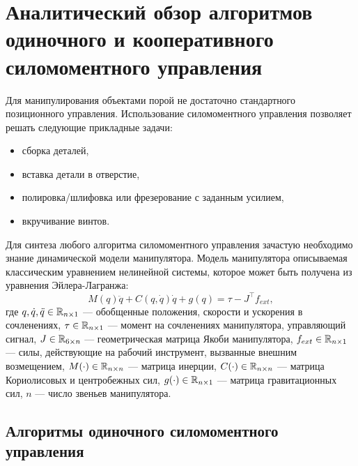\chapter{Аналитический обзор алгоритмов одиночного и кооперативного силомоментного управления}
\label{cha:analysis}
%
%

Для манипулирования объектами порой не достаточно стандартного позиционного управления. Использование силомоментного управления позволяет решать следующие прикладные задачи:
\begin{itemize}
  \item сборка деталей,
  \item вставка детали в отверстие,
  \item полировка/шлифовка или фрезерование с заданным усилием,
  \item вкручивание винтов.
\end{itemize}

Для синтеза любого алгоритма силомоментного управления зачастую необходимо знание динамической модели манипулятора. Модель манипулятора описываемая классическим уравнением нелинейной системы, которое может быть получена из уравнения Эйлера-Лагранжа:
\begin{equation}
  M(q)\ddot{q} + C(q,\dot{q})\dot{q} + g(q) = \tau - J^\top f_{ext},
  \label{eq:base_one_manipulator_model}
\end{equation}
где $q, \dot{q}, \ddot{q} \in \mathbb{R}_{n\times1}$ --- обобщенные положения, скорости и ускорения в сочленениях, $\tau \in \mathbb{R}_{n \times 1}$ --- момент на сочленениях манипулятора, управляющий сигнал, $J \in \mathbb{R}_{6 \times n}$ --- геометрическая матрица Якоби манипулятора, $f_{ext} \in \mathbb{R}_{n\times1}$ --- силы, действующие на рабочий инструмент, вызванные внешним возмещением, $M(\cdot )\in \mathbb{R}_{n\times n}$ --- матрица инерции, $C(\cdot ) \in \mathbb{R}_{n\times n}$ --- матрица Кориолисовых и центробежных сил, $g(\cdot ) \in \mathbb{R}_{n\times 1}$ --- матрица гравитационных сил, $n$ --- число звеньев манипулятора.

\section{Алгоритмы одиночного силомоментного управления}

